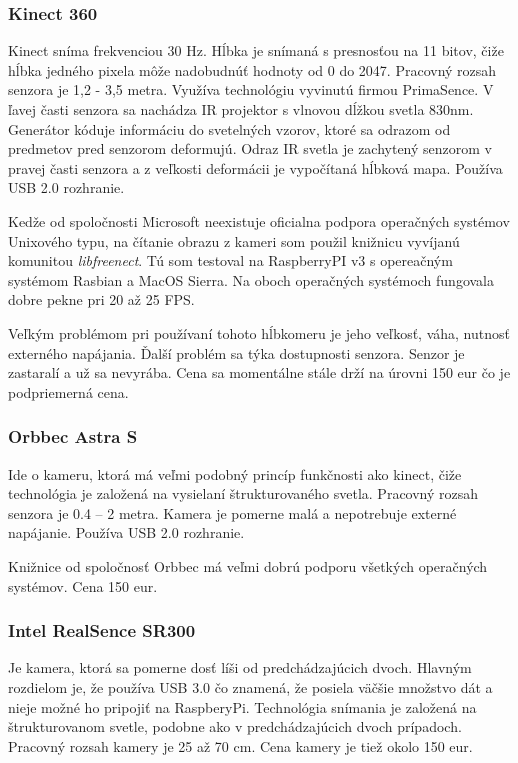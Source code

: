 \subsubsection{Kinect 360}
Kinect sníma frekvenciou 30 Hz. Hĺbka je snímaná s presnosťou na 11 bitov, čiže hĺbka jedného pixela môže nadobudnúť hodnoty od 0 do 2047.  Pracovný rozsah senzora je  1,2 - 3,5 metra.  Využíva technológiu vyvinutú firmou PrimaSence. V ľavej časti senzora sa nachádza IR projektor s vlnovou dĺžkou svetla 830nm. Generátor kóduje informáciu do svetelných vzorov, ktoré sa odrazom od predmetov pred senzorom deformujú. Odraz IR svetla je zachytený senzorom v pravej časti senzora a z veľkosti deformácii je vypočítaná hĺbková mapa. Používa USB 2.0 rozhranie. 

Kedže od spoločnosti Microsoft neexistuje oficialna podpora operačných systémov Unixového typu, na čítanie obrazu z kameri som použil knižnicu vyvíjanú komunitou \textit{libfreenect}. Tú som testoval na RaspberryPI v3 s opereačným systémom Rasbian a MacOS Sierra. Na oboch operačných systémoch fungovala dobre pekne pri 20 až 25 FPS. 

Veľkým problémom pri používaní tohoto hĺbkomeru je jeho veľkosť, váha, nutnosť externého napájania. Ďalší problém sa týka dostupnosti senzora. Senzor je zastaralí a už sa nevyrába. Cena sa momentálne stále drží na úrovni 150 eur čo je podpriemerná cena. 

\subsubsection{Orbbec Astra S}
Ide o kameru, ktorá má veľmi podobný princíp funkčnosti ako kinect, čiže technológia je založená na vysielaní štrukturovaného svetla. Pracovný rozsah senzora je 0.4 – 2 metra. Kamera je pomerne malá a nepotrebuje externé napájanie. Používa USB 2.0 rozhranie. 

Knižnice od spoločnosť Orbbec má veľmi dobrú podporu všetkých operačných systémov. Cena 150 eur. 


\subsubsection{Intel RealSence SR300}
Je kamera, ktorá sa pomerne dosť líši od predchádzajúcich dvoch. Hlavným rozdielom je, že používa USB 3.0 čo znamená, že posiela väčšie množstvo dát a nieje možné ho pripojiť na RaspberyPi. Technológia snímania je založená na štrukturovanom svetle, podobne ako v predchádzajúcich dvoch prípadoch. Pracovný rozsah kamery je 25 až 70 cm. Cena kamery je tiež okolo 150 eur. 



